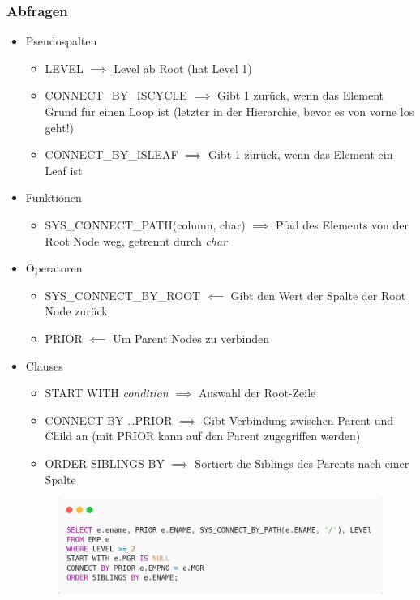 \subsubsection{Abfragen}
\begin{itemize}
    \item Pseudospalten
    \begin{itemize}
        \item LEVEL $\implies$ Level ab Root (hat Level 1)
        \item CONNECT\_BY\_ISCYCLE $\implies$ Gibt 1 zurück, wenn das Element Grund für einen Loop ist (letzter in der Hierarchie, bevor es von vorne los geht!)
        \item CONNECT\_BY\_ISLEAF $\implies$ Gibt 1 zurück, wenn das Element ein Leaf ist
    \end{itemize}
    \item Funktionen
    \begin{itemize}
        \item SYS\_CONNECT\_PATH(column, char) $\implies$ Pfad des Elements von der Root Node weg, getrennt durch \textit{char}
    \end{itemize}
    \item Operatoren
    \begin{itemize}
        \item SYS\_CONNECT\_BY\_ROOT $\impliedby$ Gibt den Wert der Spalte der Root Node zurück
        \item PRIOR $\impliedby$ Um Parent Nodes zu verbinden
    \end{itemize}
    \item Clauses
    \begin{itemize}
        \item START WITH \textit{condition} $\implies$ Auswahl der Root-Zeile
        \item CONNECT BY \dots PRIOR $\implies$ Gibt Verbindung zwischen Parent und Child an (mit PRIOR kann auf den Parent zugegriffen werden)
        \item ORDER SIBLINGS BY $\implies$ Sortiert die Siblings des Parents nach einer Spalte
    \end{itemize}
    \begin{figure}[H]
        \centering
        \includegraphics[scale=.3]{res/themenkorb_2/hierarchical.png} 
    \end{figure}
\end{itemize}
